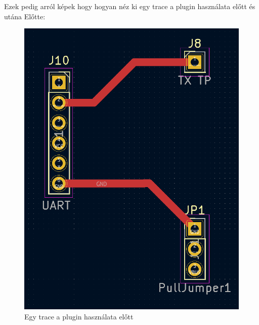 \documentclass[a4paper,12pt,oneside]{book}
\begin{document}
Ezek pedig arról képek hogy hogyan néz ki egy trace a plugin használata előtt és utána
Előtte:
\begin{figure}[H]
	\centering
	\includegraphics[trim=1mm 1mm 1mm 1mm,scale=0.35]{beforrounded.PNG}
	\caption{Egy trace a plugin használata előtt}
	\label{Egy trace a plugin használata előtt}
\end{figure}
\end{document}
